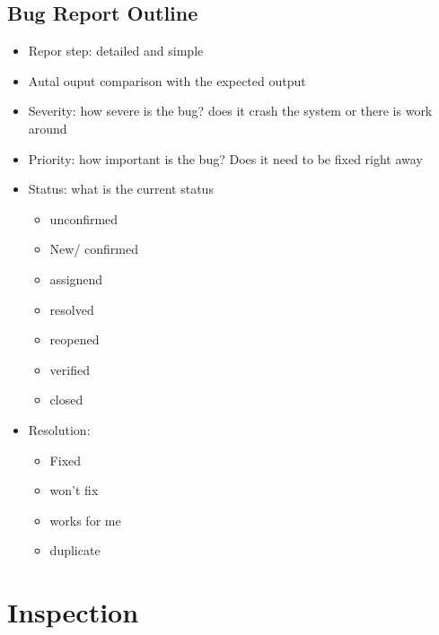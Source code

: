 \documentclass{article}
\begin{document}
 \subsection{ Bug Report Outline}
 \begin{itemize}
   \item Repor step: detailed and simple
   \item Autal ouput comparison with the expected output
   \item Severity: how severe is the bug? does it crash the system or there is
   work around
   \item Priority: how important is the bug? Does it need to be fixed right away
   \item Status: what is the current status
   \begin{itemize}
     \item unconfirmed
     \item New/ confirmed
     \item assignend
     \item resolved
     \item reopened
     \item verified
     \item closed
    \end{itemize}
   \item Resolution:
   \begin{itemize}
     \item Fixed
     \item won't fix
     \item works for me
     \item duplicate
    \end{itemize}
 \end{itemize}
  
  
 \section{ Inspection}
\end{document}
